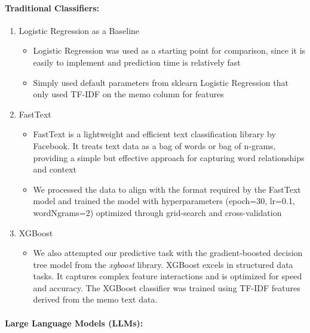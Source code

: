 \documentclass[12pt,letterpaper]{article}
\begin{document}
\paragraph{Traditional Classifiers:}
    \begin{enumerate}
        \item {Logistic Regression as a Baseline}
            \begin{itemize}
                \item {Logistic Regression was used as a starting point for comparison, since it is easily to implement and prediction time is relatively fast}
                \item {Simply used default parameters from sklearn Logistic Regression that only used TF-IDF on the memo column for features}
            \end{itemize}
        \item {FastText}
            \begin{itemize}
                \item {FastText is a lightweight and efficient text classification library by Facebook. It treats text data as a bag of words or bag of n-grams, providing a simple but effective approach for capturing word relationships and context}
                \item {We processed the data to align with the format required by the FastText model and trained the model with hyperparameters (epoch=30, lr=0.1, wordNgrams=2) optimized through grid-search and cross-validation}
            \end{itemize}
        \item {XGBoost}
            \begin{itemize}
                \item{We also attempted our predictive task with the gradient-boosted decision tree model from the \textit{xgboost} library. XGBoost excels in structured data tasks. It captures complex feature interactions and is optimized for speed and accuracy. The XGBoost classifier was trained using TF-IDF features derived from the memo text data.}
            \end{itemize}
    \end{enumerate}

\paragraph{Large Language Models (LLMs):}
\end{document}
